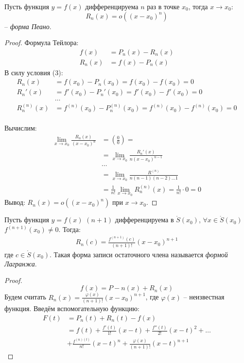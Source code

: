 \begin{theorem}
  Пусть функция $y = f(x)$ дифференцируема $n$ раз в точке $x_0$, тогда $x \to x_0$: \[
    \boxed{R_n(x) = o((x - x_0)^n)}
  \] 
  -- \textit{форма Пеано}. 
\end{theorem}
\begin{proof}
  Формула Тейлора:
  \begin{align*}
    f(x) &= P_n(x) - R_n(x) \\
    R_n(x) &= f(x) - P_n(x)
  \end{align*}
  В силу условия (3):
  \begin{align*}
    R_n(x) &= f(x_0) - P_n(x_0) = f(x_0) - f(x_0) = 0 \\
    R_n'(x) &= f'(x_0) - P_n'(x_0) = f'(x_0) - f'(x_0) = 0 \\
            &\ldots \\
    R_n^{(n)}(x) &= f^{(n)}(x_0) - P_n^{(n)}(x_0) = f^{(n)}(x_0) - f^{(n)}(x_0) = 0 \\
  \end{align*}

  Вычислим: 
  \begin{align*}
    \lim_{x \to x_0} \frac{R_n(x)}{(x - x_0)^n} &= \left( \frac{0}{0} \right) = \\
      &= \lim_{x \to x_0} \frac{R_n'(x)}{n(x - x_0)^{n-1}} \\
      &\ldots \\
      &= \lim_{x \to x_0} \frac{R^{(n)}}{n(n-1)(n-2) \ldots 1} \\
      &= \frac{1}{n!} \lim_{x \to x_0} R_n^{(n)}(x) = \frac{1}{n!} \cdot 0 = 0 
  \end{align*}
  Вывод: $R_n(x) = o((x - x_0)^n)$ при $x \to x_0$.
\end{proof}

\begin{theorem}
  Пусть функция $y=f(x)$  $(n+1)$ дифференцируема в $\mathring{S}(x_0)$, $\forall x \in \mathring{S}(x_0)$ $f^{(n+1)}(x_0) \neq 0$.
  Тогда:
  \begin{gather*}
    \boxed{
      R_n(c) = \frac{f^{(n+1)}(c)}{(n+1)!}(x-x_0)^{n+1}
    }
  \end{gather*} 
  где $c \in \mathring{S}(x_0)$.
  Такая форма записи остаточного члена называется \textit{формой Лагранжа}. 
\end{theorem}
\begin{proof}
  \[
    f(x) = P-n(x) + R_n(x)
  \]
  Будем считать $R_n(x) = \frac{\varphi(x)}{(n+1)!}(x-x_0)^{n+1}$, где $\varphi(x)$ -- неизвестная функция. Введём вспомогательную функцию:
  \begin{align*}
    F(t) &= P_n(t) + R_n(t) - f(x) \\
         &= f(t) + \frac{f'(t)}{1!}(x-t) + \frac{f''(t)}{2!}(x-t)^2 + \ldots\\
         &+ \frac{f^{(n)(t)}}{n!}(x-t)^n + \frac{\varphi(x)}{(n+1)!}(x-t)^{n+1}
  \end{align*}
\end{proof}

